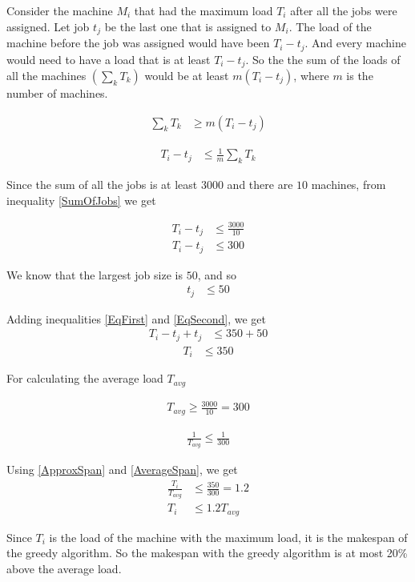 \documentclass[paper=a4, fontsize=11pt]{scrartcl} %
\numberwithin{figure}{section} %
\numberwithin{table}{section} %
\begin{document}
\begin{enumerate}
Consider the machine $M_i$ that had the maximum load $T_i$ after all the jobs were assigned. Let job $t_j$ be the last one that is assigned to $M_i$. The load of the machine before the job was assigned would have been $T_i - t_j$. And every machine would need to have a load that is at least $T_i - t_j$. So the the sum of the loads of all the machines $(\sum_k T_k)$ would be at least $m (T_i - t_j)$, where $m$ is the number of machines.

\begin{align*} 
\sum_k T_k &\geq m (T_i - t_j)
\end{align*}

\begin{align} \label{SumOfJobs}
T_i - t_j &\leq \frac{1}{m} \sum_k T_k
\end{align}

Since the sum of all the jobs is at least $3000$ and there are $10$ machines, from inequality \ref{SumOfJobs} we get

\begin{align*} 
T_i - t_j &\leq \frac{3000}{10} 
\end{align*}
\begin{align} \label{EqFirst}
T_i - t_j &\leq 300
\end{align}

We know that the largest job size is $50$, and so
\begin{align} \label{EqSecond}
t_j &\leq 50
\end{align}

Adding inequalities \ref{EqFirst} and \ref{EqSecond}, we get
\begin{align*} 
T_i - t_j + t_j &\leq 350 + 50
\end{align*}
\begin{align} \label{ApproxSpan}
T_i &\leq 350
\end{align}

For calculating the average load $T_{avg}$

\begin{align*} 
T_{avg} \geq \frac{3000}{10} = 300
\end{align*}

\begin{align} \label{AverageSpan}
\frac{1}{T_{avg}} \leq \frac{1}{300}
\end{align}

Using  \ref{ApproxSpan} and \ref{AverageSpan}, we get
\begin{align*} 
\frac{T_i}{T_{avg}} &\leq \frac{350}{300} = 1.2\\
T_i &\leq 1.2 T_{avg}
\end{align*}

Since $T_i$ is the load of the machine with the maximum load, it is the makespan of the greedy algorithm. So the makespan with the greedy algorithm is at most 20\% above the average load.

\end{enumerate}

\end{document}
